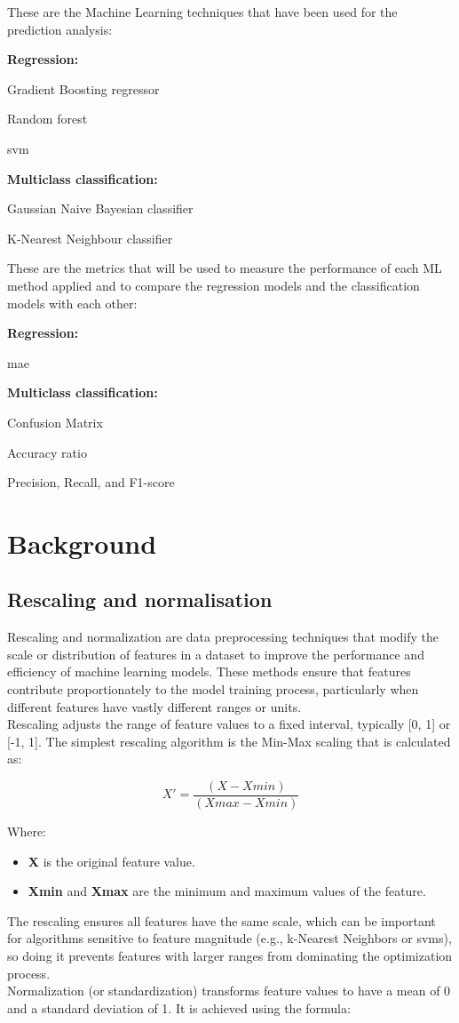 \documentclass[11pt,a4paper]{article}
\newcommand{\SubItem}[1]{
  {\setlength\itemindent{13pt} \item[◦] #1}
}
\begin{document}
These are the Machine Learning techniques that have been used for the prediction analysis:
\begin{itemize}
\item \textbf{Regression:}
\SubItem{Gradient Boosting regressor}
\SubItem{Random forest }
\SubItem{\acrfull{svm}}
\item \textbf{Multiclass classification:}
\SubItem{Gaussian Naive Bayesian classifier}
\SubItem{K-Nearest Neighbour classifier}
\end{itemize}
These are the metrics that will be used to measure the performance of each ML method applied and to compare the regression models and the classification models with each other:
\begin{itemize}
\item \textbf{Regression:}
\SubItem{\acrfull{mae}}
\item \textbf{Multiclass classification:}
\SubItem{Confusion Matrix}
\SubItem{Accuracy ratio}
\SubItem{Precision, Recall, and F1-score}
\end{itemize}

\section{Background}
\subsection{Rescaling and normalisation} 
Rescaling and normalization are data preprocessing techniques that modify the scale or distribution of features in a dataset to improve the performance and efficiency of machine learning models. These methods ensure that features contribute proportionately to the model training process, particularly when different features have vastly different ranges or units.
\\
Rescaling adjusts the range of feature values to a fixed interval, typically [0, 1] or [-1, 1]. The simplest rescaling algorithm is the Min-Max scaling that is calculated as:

\begin{displaymath}
X' = \frac{(X - Xmin)}{(Xmax - Xmin)}  
\end{displaymath}

Where:
\begin{itemize}
\item \textbf{X} is the original feature value.
\item \textbf{Xmin} and \textbf{Xmax} are the minimum and maximum values of the feature.
\end{itemize}
The rescaling ensures all features have the same scale, which can be important for algorithms sensitive to feature magnitude (e.g., k-Nearest Neighbors or \acrshort{svm}s), so doing it prevents features with larger ranges from dominating the optimization process.
\\
Normalization (or standardization) transforms feature values to have a mean of 0 and a standard deviation of 1. It is achieved using the formula:
\end{document}
